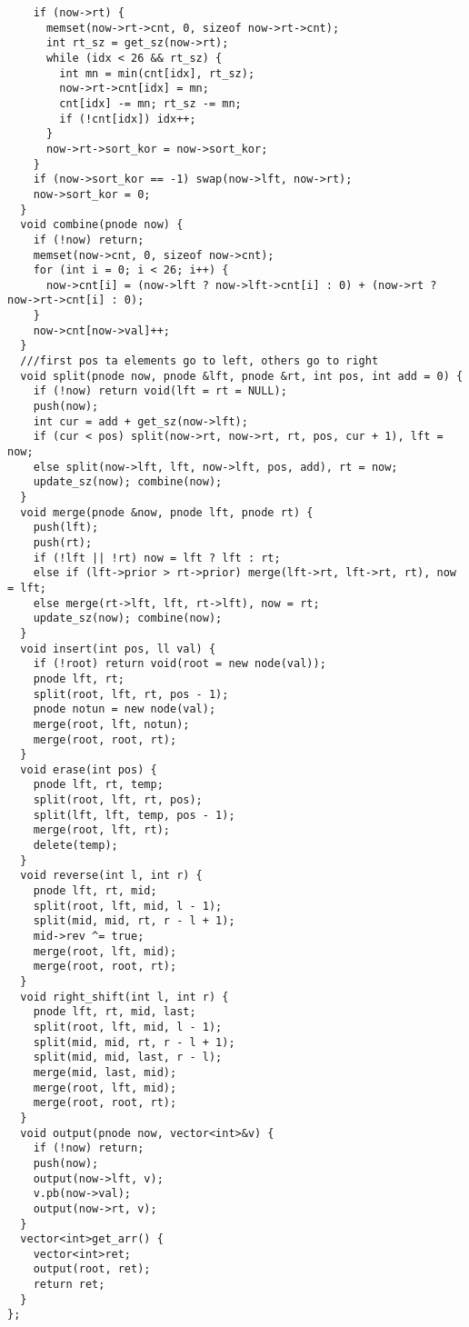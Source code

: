 \documentclass[FSZ,a4paper,onesided]{article}
\begin{document}
\begin{multicols*}{\COLS}
\begin{lstlisting}
    if (now->rt) {
      memset(now->rt->cnt, 0, sizeof now->rt->cnt);
      int rt_sz = get_sz(now->rt);
      while (idx < 26 && rt_sz) {
        int mn = min(cnt[idx], rt_sz);
        now->rt->cnt[idx] = mn;
        cnt[idx] -= mn; rt_sz -= mn;
        if (!cnt[idx]) idx++;
      }
      now->rt->sort_kor = now->sort_kor;
    }
    if (now->sort_kor == -1) swap(now->lft, now->rt);
    now->sort_kor = 0;
  }
  void combine(pnode now) {
    if (!now) return;
    memset(now->cnt, 0, sizeof now->cnt);
    for (int i = 0; i < 26; i++) {
      now->cnt[i] = (now->lft ? now->lft->cnt[i] : 0) + (now->rt ? now->rt->cnt[i] : 0);
    }
    now->cnt[now->val]++;
  }
  ///first pos ta elements go to left, others go to right
  void split(pnode now, pnode &lft, pnode &rt, int pos, int add = 0) {
    if (!now) return void(lft = rt = NULL);
    push(now);
    int cur = add + get_sz(now->lft);
    if (cur < pos) split(now->rt, now->rt, rt, pos, cur + 1), lft = now;
    else split(now->lft, lft, now->lft, pos, add), rt = now;
    update_sz(now); combine(now);
  }
  void merge(pnode &now, pnode lft, pnode rt) {
    push(lft);
    push(rt);
    if (!lft || !rt) now = lft ? lft : rt;
    else if (lft->prior > rt->prior) merge(lft->rt, lft->rt, rt), now = lft;
    else merge(rt->lft, lft, rt->lft), now = rt;
    update_sz(now); combine(now);
  }
  void insert(int pos, ll val) {
    if (!root) return void(root = new node(val));
    pnode lft, rt;
    split(root, lft, rt, pos - 1);
    pnode notun = new node(val);
    merge(root, lft, notun);
    merge(root, root, rt);
  }
  void erase(int pos) {
    pnode lft, rt, temp;
    split(root, lft, rt, pos);
    split(lft, lft, temp, pos - 1);
    merge(root, lft, rt);
    delete(temp);
  }
  void reverse(int l, int r) {
    pnode lft, rt, mid;
    split(root, lft, mid, l - 1);
    split(mid, mid, rt, r - l + 1);
    mid->rev ^= true;
    merge(root, lft, mid);
    merge(root, root, rt);
  }
  void right_shift(int l, int r) {
    pnode lft, rt, mid, last;
    split(root, lft, mid, l - 1);
    split(mid, mid, rt, r - l + 1);
    split(mid, mid, last, r - l);
    merge(mid, last, mid);
    merge(root, lft, mid);
    merge(root, root, rt);
  }
  void output(pnode now, vector<int>&v) {
    if (!now) return;
    push(now);
    output(now->lft, v);
    v.pb(now->val);
    output(now->rt, v);
  }
  vector<int>get_arr() {
    vector<int>ret;
    output(root, ret);
    return ret;
  }
};
\end{lstlisting}

\end{multicols*}
\end{document}

